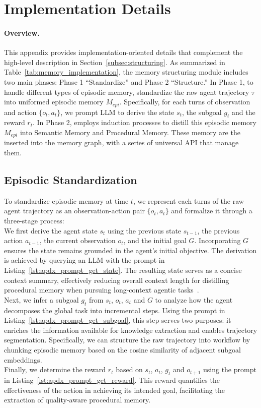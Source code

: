 \section{Implementation Details}
\label{app:implementation}


\paragraph{Overview.} {This appendix provides implementation-oriented details that complement the high-level description in Section~\ref{subsec:structuring}. As summarized in Table~\ref{tab:memory_implementation}, the memory structuring module includes two main phases: Phase 1 ``Standardize'' and Phase 2 ``Structure.'' In Phase 1, to handle different types of episodic memory, \plugmem standardize the raw agent trajectory $\tau$ into uniformed episodic memory $M_{epi}$. Specifically, for each turns of observation and action $\{o_t, a_t\}$, we prompt LLM to derive the state $s_t$, the subgoal $g_t$ and the reward $r_t$. In Phase 2, \plugmem employs induction processes to distill this episodic memory $M_{epi}$ into Semantic Memory and Procedural Memory. These memory are the inserted into the memory graph, with a series of universal API that manage them.
\subsection{Episodic Standardization}
\label{app:implementation_standardize_episodic}

To standardize episodic memory at time $t$, we represent each turns of the raw agent trajectory as an observation-action pair $\{o_t,a_t\}$ and formalize it through a three-stage process:\\
We first derive the agent state $s_t$ using the previous state $s_{t-1}$, the previous action $a_{t-1}$, the current observation $o_t$, and the initial goal $G$. Incorporating $G$ ensures the state remains grounded in the agent's initial objective. The derivation is achieved by querying an LLM with the prompt in Listing~\ref{lst:apdx_prompt_get_state}. The resulting state serves as a concise context summary, effectively reducing overall context length for distilling procedural memory when pursuing long-context agentic tasks~\cite{wu2024longmemeval,zhou2024webarenarealisticwebenvironment}.\\
Next, we infer a subgoal $g_t$ from $s_t$, $o_t$, $a_t$ and $G$ to analyze how the agent decomposes the global task into incremental steps. Using the prompt in Listing~\ref{lst:apdx_prompt_get_subgoal}, this step serves two purposes: it enriches the information available for knowledge extraction and enables trajectory segmentation. Specifically, we can structure the raw trajectory into workflow by chunking episodic memory based on the cosine similarity of adjacent subgoal embeddings.\\
Finally, we determine the reward $r_t$ based on $s_t$, $a_t$, $g_t$ and $o_{t+1}$ using the prompt in Listing~\ref{lst:apdx_prompt_get_reward}. This reward quantifies the effectiveness of the action in achieving its intended goal, facilitating the extraction of quality-aware procedural memory.

}
